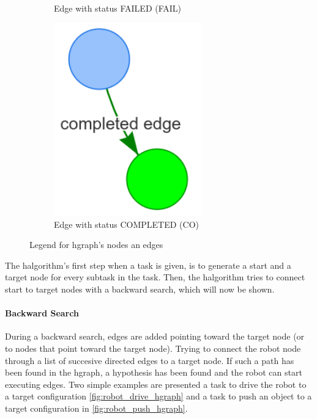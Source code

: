 \begin{figure}[H]
\begin{subfigure}{0.33\textwidth}
    \caption{Edge with status FAILED (FAIL)}%
    \end{subfigure}
    \begin{subfigure}{0.33\textwidth}
    \centering
    \includegraphics[width=0.7\textwidth]{figures/connecting_nodes/legend/completed_edge}
    \caption{Edge with status COMPLETED (CO)}%
    \end{subfigure}

    \caption{Legend for \ac{hgraph}'s nodes an edges}%
    \label{fig:hgraph_legend}
\end{figure}

The \ac{halgorithm}'s first step when a task is given, is to generate a start and a target node for every subtask in the task. Then, the \ac{halgorithm} tries to connect start to target nodes with a backward search, which will now be shown.\bs

\paragraph{Backward Search}%
During a backward search, edges are added pointing toward the target node (or to nodes that point toward the target node). Trying to connect the robot node through a list of succesive directed edges to a target node. If such a path has been found in the \ac{hgraph}, a hypothesis has been found and the robot can start executing edges. Two simple examples are presented a task to drive the robot to a target configuration \cref{fig:robot_drive_hgraph} and a task to push an object to a target configuration in \cref{fig:robot_push_hgraph}.\bs

